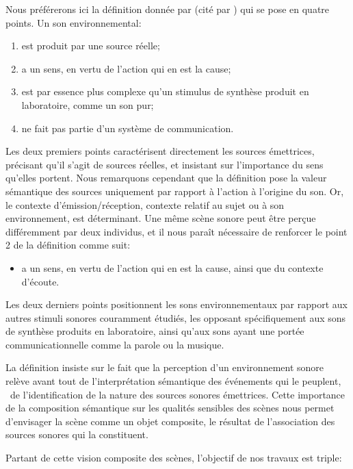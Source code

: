 Nous préférerons ici la définition donnée par \cite{vanderveer1980ecological} (cité par \cite{ballas1987interpreting}) qui se pose en quatre points. Un son environnemental:

\begin{enumerate}
\item est produit par une source réelle;
\item a un sens, en vertu de l'action qui en est la cause;
\item est par essence plus complexe qu'un stimulus de synthèse produit en laboratoire, comme un son pur;
\item ne fait pas partie d'un système de communication.
\end{enumerate}

Les deux premiers points caractérisent directement les sources émettrices, précisant qu'il s'agit de sources réelles, et insistant sur l'importance du sens qu'elles portent. Nous remarquons cependant que la définition pose la valeur sémantique des sources uniquement par rapport à l'action à l'origine du son. Or, le contexte d'émission/réception, contexte relatif au sujet ou à son environnement, est déterminant. Une même scène sonore peut être perçue différemment par deux individus, et il nous paraît nécessaire de renforcer le point 2 de la définition comme suit:

\begin{itemize}
\setcounter{enumi}{2}
\item a un sens, en vertu de l'action qui en est la cause, ainsi que du contexte d'écoute.
\end{itemize}

Les deux derniers points positionnent les sons environnementaux par rapport aux autres stimuli sonores couramment étudiés, les opposant spécifiquement aux sons de synthèse produits en laboratoire, ainsi qu'aux sons ayant une portée communicationnelle comme la parole ou la musique.

La définition insiste sur le fait que la perception d'un environnement sonore relève avant tout de l'interprétation sémantique des événements qui le peuplent, \ie~de l'identification de la nature des sources sonores émettrices. Cette importance de la composition sémantique sur les qualités sensibles des scènes nous permet d'envisager la scène comme un objet composite, le résultat de l'association des sources sonores qui la constituent.

Partant de cette vision composite des scènes, l'objectif de nos travaux est triple:

